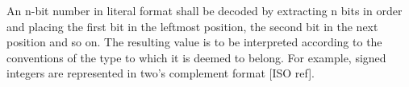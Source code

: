 An n-bit number in literal format shall be decoded by extracting n bits
in order and placing the first bit in the leftmost position, the second
bit in the next position and so on. The resulting value is to be
interpreted according to the conventions of the type to which it is
deemed to belong. For example, signed integers are represented in
two's complement format [ISO ref].


